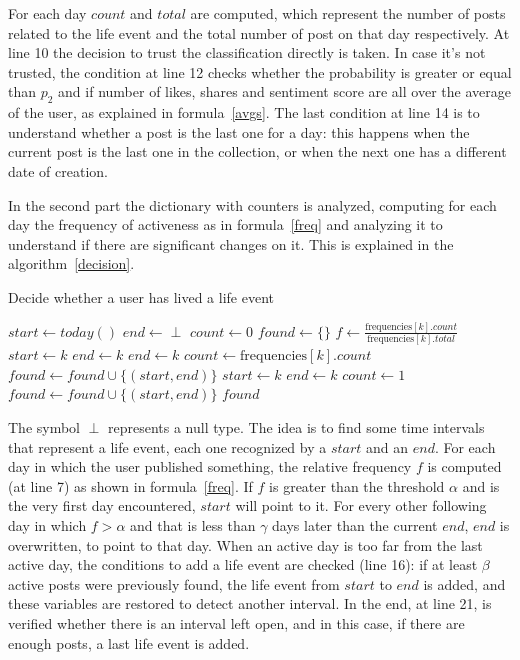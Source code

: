 For each day $count$ and $total$ are computed, which represent the number of posts related to the life event and the total number of post on that day respectively. At line 10 the decision to trust the classification directly is taken. In case it's not trusted, the condition at line 12 checks whether the probability is greater or equal than $p_2$ and if number of likes, shares and sentiment score are all over the average of the user, as explained in formula~\ref{avgs}. The last condition at line 14 is to understand whether a post is the last one for a day: this happens when the current post is the last one in the collection, or when the next one has a different date of creation.

In the second part the dictionary with counters is analyzed, computing for each day the frequency of activeness as in formula~\ref{freq} and analyzing it to understand if there are significant changes on it. This is explained in the algorithm~\ref{decision}.

\begin{algorithm}
\caption{Decide whether a user has lived a life event}
\label{decision}
\begin{algorithmic}[1]
\State $start \gets today()$
\State $end \gets \perp$
\State $count \gets 0$
\State $found \gets \{\}$
	\State $f \gets \frac{\text{frequencies}[k].count}{\text{frequencies}[k].total}$
			\State $start \gets k$
			\State $end \gets k$
		\EndIf
			\State $end \gets k$
			\State $count \gets \text{frequencies}[k].count$
		\Else
				\State $found \gets found \cup \{(start, end)\}$
			\EndIf
			\State $start \gets k$
			\State $end \gets k$
			\State $count \gets 1$
		\EndIf
	\EndIf
\EndFor
{}
	\State $found \gets found \cup \{(start, end)\}$
\EndIf
\Return $found$
\EndFunction
\end{algorithmic}
\end{algorithm}

The symbol $\perp$ represents a null type. The idea is to find some time intervals that represent a life event, each one recognized by a $start$ and an $end$. For each day in which the user published something, the relative frequency $f$ is computed (at line 7) as shown in formula~\ref{freq}. If $f$ is greater than the threshold $\alpha$ and is the very first day encountered, $start$ will point to it. For every other following day in which $f > \alpha$ and that is less than $\gamma$ days later than the current $end$, $end$ is overwritten, to point to that day. When an active day is too far from the last active day, the conditions to add a life event are checked (line 16): if at least $\beta$ active posts were previously found, the life event from $start$ to $end$ is added, and these variables are restored to detect another interval. In the end, at line 21, is verified whether there is an interval left open, and in this case, if there are enough posts, a last life event is added.

